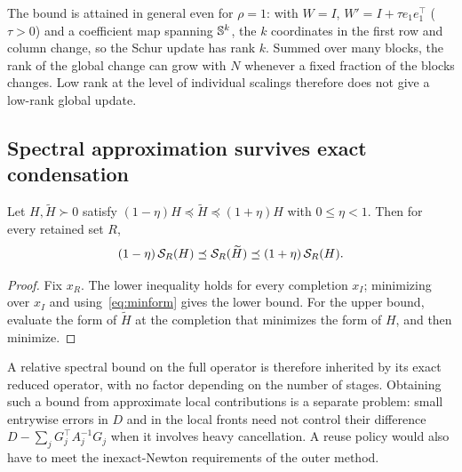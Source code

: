 The bound is attained in general even for $\rho=1$: with $W=I$,
$W'=I+\tau e_1e_1^\top$ ($\tau>0$) and a coefficient map spanning $\mathbb S^k$, the
$k$ coordinates in the first row and column change, so the Schur update has rank
$k$. Summed over many blocks, the rank of the global change can grow with $N$
whenever a fixed fraction of the blocks changes. Low rank at the level of
individual scalings therefore does not give a low-rank global update.

\subsection{Spectral approximation survives exact condensation}

\begin{proposition}\label{prop:spectral}
Let $H,\widetilde H\succ0$ satisfy $(1-\eta)H\preceq\widetilde H\preceq(1+\eta)H$
with $0\le\eta<1$. Then for every retained set $R$,
\begin{equation}\label{eq:spectral}
(1-\eta)\,\mathcal S_R(H)\preceq\mathcal S_R(\widetilde H)\preceq(1+\eta)\,\mathcal S_R(H).
\end{equation}
\end{proposition}

\begin{proof}
Fix $x_R$. The lower inequality holds for every completion $x_I$; minimizing
over $x_I$ and using~\eqref{eq:minform} gives the lower bound. For the upper
bound, evaluate the form of $\widetilde H$ at the completion that minimizes the
form of $H$, and then minimize.
\end{proof}

A relative spectral bound on the full operator is therefore inherited by its
exact reduced operator, with no factor depending on the number of stages. Obtaining
such a bound from approximate local contributions is a separate problem:
small entrywise errors in $D$ and in the local fronts need not control their
difference $D-\sum_jG_j^\top A_j^{-1}G_j$ when it involves heavy cancellation.
A reuse policy would also have to meet the inexact-Newton requirements of the
outer method.
